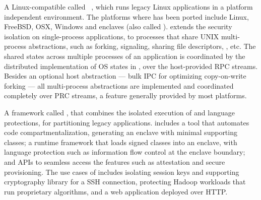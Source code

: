 \begin{compactitem}

\item A Linux-compatible \libos{} called \term{\graphene{}}~\citep{tsai14graphene},
which runs legacy Linux applications in a platform independent environment.
The platforms where \graphene{} has been ported
include Linux, FreeBSD, OSX,
Windows and \sgx{} enclaves (also called \term{\graphenesgx{}}).
\graphene{} extends the security isolation on single-process applications,
to processes that share UNIX multi-process abstractions,
such as forking, signaling, sharing file descriptors, \sysvipc{}, etc.
The shared states across multiple processes of an application
is coordinated by the distributed implementation of OS states in \graphene{},
over the host-provided RPC streams.
Besides an optional host abstraction ---
bulk IPC for optimizing copy-on-write forking ---
all multi-process abstractions are
implemented and coordinated completely over PRC streams,
a feature generally provided by most platforms.

\item
A framework called ,
that combines the isolated execution of \sgx{} and
\java{} language protections,
for partitioning legacy \java{} applications.
\civet{} includes
a tool that automates code compartmentalization,
generating an enclave with minimal supporting \java{} classes;
a runtime framework that loads signed classes into an enclave,
with language protection such as information flow control at the enclave boundary;
and \java{} APIs to seamless access the \sgx{} features such
as attestation and secure provisioning.
The use cases of \civet{} includes
isolating session keys and supporting cryptography library for a SSH connection,
protecting Hadoop workloads that run proprietary algorithms,
and a web application deployed over HTTP.




\end{compactitem}
